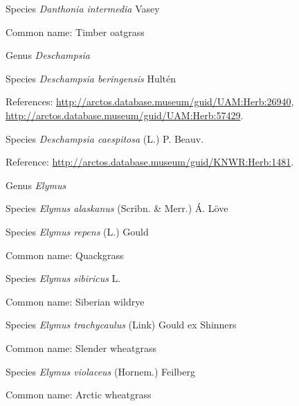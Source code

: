 \documentclass[9pt, article]{memoir}
\begin{document}
\begin{multicols}{2}
\vspace{6pt}\noindent\hspace{36pt}Species \textit{Danthonia intermedia} Vasey


Common name: Timber oatgrass

\vspace{6pt}\noindent\hspace{30pt}Genus \textit{Deschampsia}


\vspace{6pt}\noindent\hspace{36pt}Species \textit{Deschampsia beringensis} Hultén


References: 
\url{http://arctos.database.museum/guid/UAM:Herb:26940}, 
\url{http://arctos.database.museum/guid/UAM:Herb:57429}.

\vspace{6pt}\noindent\hspace{36pt}Species \textit{Deschampsia caespitosa} (L.) P. Beauv.


Reference: 
\url{http://arctos.database.museum/guid/KNWR:Herb:1481}.

\vspace{6pt}\noindent\hspace{30pt}Genus \textit{Elymus}


\vspace{6pt}\noindent\hspace{36pt}Species \textit{Elymus alaskanus} (Scribn. \& Merr.) Á. Löve


\vspace{6pt}\noindent\hspace{36pt}Species \textit{Elymus repens} (L.) Gould


Common name: Quackgrass

\vspace{6pt}\noindent\hspace{36pt}Species \textit{Elymus sibiricus} L.


Common name: Siberian wildrye

\vspace{6pt}\noindent\hspace{36pt}Species \textit{Elymus trachycaulus} (Link) Gould ex Shinners


Common name: Slender wheatgrass

\vspace{6pt}\noindent\hspace{36pt}Species \textit{Elymus violaceus} (Hornem.) Feilberg


Common name: Arctic wheatgrass


\end{multicols}
\end{document}

